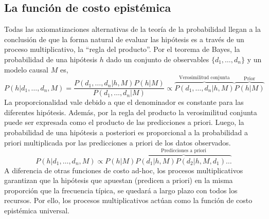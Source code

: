 \documentclass[a4paper,10pt]{book}
\theoremstyle{definition}
\begin{document}

\subsection{La funci\'on de costo epist\'emica}

% 
Todas las axiomatizaciones alternativas de la teor\'ia de la probabilidad llegan a la conclusi\'on de que la forma natural de evaluar las hip\'otesis es a trav\'es de un proceso multiplicativo, la ``regla del producto''.
%
Por el teorema de Bayes, la probabilidad de una hipótesis $h$ dado un conjunto de observables $\{d_1, \dots, d_n \}$ y un modelo causal $M$ es,
%
\begin{equation}
P(h|d_1, \dots, d_n, M) = \frac{P(d_1, \dots, d_n|h, M) P(h|M)}{P(d_1, \dots, d_n| M)} \propto \overbrace{P(d_1, \dots, d_n|h, M)}^{\text{Verosimilitud conjunta}} \overbrace{P(h|M)}^{\text{Prior}}
\end{equation}
%
La proporcionalidad vale debido a que el denominador es constante para las diferentes hipótesis.
%
Además, por la regla del producto la verosimilitud conjunta puede ser expresada como el producto de las predicciones a priori.
%
Luego, la probabilidad de una hipótesis a posteriori es proporcional a la probabilidad a priori multiplicada por las predicciones a priori de los datos observados.
%
\begin{equation}
P(h|d_1, \dots, d_n, M) \propto P(h|M) \overbrace{P(d_1|h,M) P(d_2|h,M,d_1) \dots }^{\text{Predicciones a priori}}
\end{equation}
%
A diferencia de otras funciones de costo ad-hoc, los procesos multiplicativos garantizan que la hip\'otesis que apuestan (predicen a priori) en la misma proporci\'on que la frecuencia t\'ipica, se quedar\'a a largo plazo con todos los recursos.
%
Por ello, los procesos multiplicativos actúan como la funci\'on de costo epistémica universal.
\end{document}
